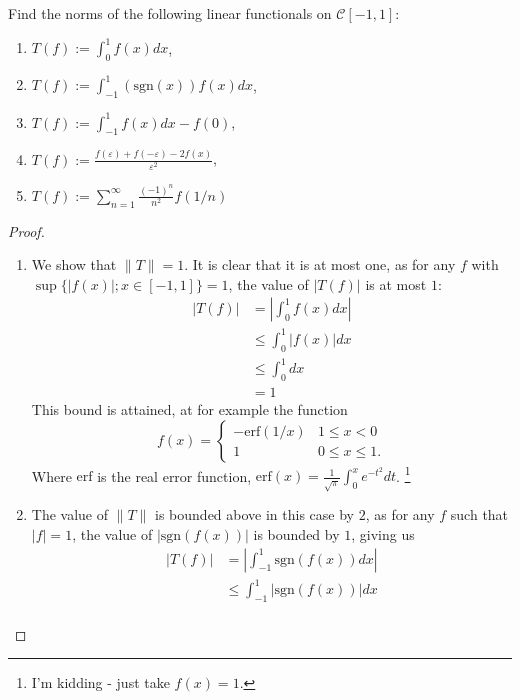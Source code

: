 \documentclass[12pt]{article}
\theoremstyle{definition}
\newenvironment{problem}[2][Problem]{\begin{trivlist}
\item[\hskip \labelsep {\bfseries #1}\hskip \labelsep {\bfseries #2.}]}{\end{trivlist}}
\begin{document}
\begin{problem}{3}
Find the norms of the following linear functionals on $\mathcal{C}[-1,1]$:\
\begin{enumerate}[label=(\roman*)]
    \item $T(f) := \int_0^1 f(x) dx$,
    \item $T(f) := \int_{-1}^1 (\text{sgn}(x)) f(x) dx$,
    \item $T(f) := \int_{-1}^1 f(x) dx - f(0)$,
    \item $T(f) := \frac{f(\varepsilon) + f(-\varepsilon) - 2f(x)}{\varepsilon^2}$,
    \item $T(f) := \sum_{n=1}^\infty \frac{(-1)^n}{n^2} f(1/n)$
\end{enumerate}
\end{problem}
\begin{proof}
    \begin{enumerate}[label=(\roman*)]
        \item We show that $\lVert T \rVert = 1$. It is clear that it is at most one, as for any $f$ with $\sup \{ \lvert f(x) \rvert; x \in [-1,1]\} = 1$, the value of $\lvert T(f) \rvert$ is at most $1$:
        \begin{align*}
            \lvert T(f) \rvert &= \left \lvert \int_0^1 f(x) dx \right \rvert \\
            &\leq \int_0^1 \lvert f(x) \rvert dx\\
            &\leq \int_0^1 dx\\
            &= 1
        \end{align*}
        This bound is attained, at for example the function 
        \[
            f(x) = \begin{cases}
                -\text{erf}(1/x) & 1 \leq x < 0\\
		1 & 0 \leq x \leq 1.
            \end{cases}
        \]
	Where $\text{erf}$ is the real error function, $\text{erf}(x) = \frac{1}{\sqrt{\pi}}\int_0^x e^{-t^2}dt$.
	\footnote{I'm kidding - just take $f(x) = 1$.}
        \item The value of $\lVert T \rVert$ is bounded above in this case by $2$, as for any $f$ such that $\lvert f \rvert = 1$, the value of $\lvert \text{sgn} (f(x)) \rvert$ is bounded by $1$, giving us
        \begin{align*}
            \lvert T(f) \rvert &= \left \lvert \int_{-1}^1 \text{sgn}(f(x)) dx \right \rvert \\
            & \leq \int_{-1}^1 \lvert \text{sgn}(f(x)) \rvert dx \\

\end{align*}
\end{enumerate}
\end{proof}
\end{document}
